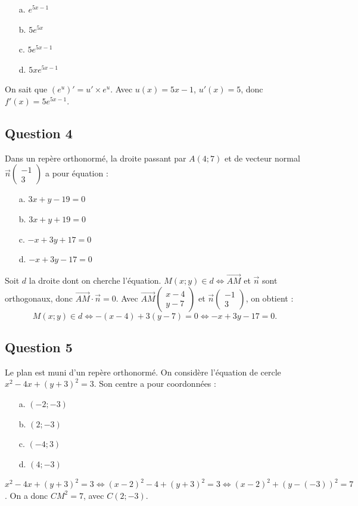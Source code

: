 	\begin{itemize}
		\item[a.] $e^{5x-1}$
		\item[b.] $5e^{5x}$
		\item[c.] $5e^{5x-1}$
		\item[d.] $5xe^{5x-1}$
	\end{itemize}
	
	On sait que $(e^u)' = u' \times e^u$. Avec $u(x) = 5x - 1$, $u'(x) = 5$, donc $f'(x) = 5e^{5x-1}$.
	
	\subsection*{Question 4}
	Dans un repère orthonormé, la droite passant par $A(4; 7)$ et de vecteur normal $\vec{n}\left( \begin{array}{c}
		-1 \\
		3 \end{array} \right)$ a pour équation :
	
	\begin{itemize}
		\item[a.] $3x + y - 19 = 0$
		\item[b.] $3x + y + 19 = 0$
		\item[c.] $-x + 3y + 17 = 0$
		\item[d.] $-x + 3y - 17 = 0$
	\end{itemize}
	
	Soit $d$ la droite dont on cherche l’équation. $M(x ; y) \in d \Leftrightarrow \overrightarrow{AM}$ et $\vec{n}$ sont orthogonaux, donc $\overrightarrow{AM} \cdot \vec{n} = 0$. Avec $\overrightarrow{AM} \left( \begin{array}{c}
		x-4 \\
		y-7 \end{array} \right)$ et $\vec{n} \left( \begin{array}{c}
		-1 \\
		3 \end{array} \right)$, on obtient :
	\[ M(x ; y) \in d \Leftrightarrow -(x - 4) + 3(y - 7) = 0 \Leftrightarrow -x + 3y - 17 = 0. \]
	
	\subsection*{Question 5}
	Le plan est muni d’un repère orthonormé. On considère l’équation de cercle $x^2 - 4x + (y + 3)^2 = 3$. Son centre a pour coordonnées :
	
	\begin{itemize}
		\item[a.] $(-2 ; -3)$
		\item[b.] $(2 ; -3)$
		\item[c.] $(-4 ; 3)$
		\item[d.] $(4 ; -3)$
	\end{itemize}
	
	$x^2 - 4x + (y + 3)^2 = 3 \Leftrightarrow (x - 2)^2 - 4 + (y + 3)^2 = 3 \Leftrightarrow (x - 2)^2 + (y - (-3))^2 = 7$. On a donc $CM^2 = 7$, avec $C(2 ; -3)$.
